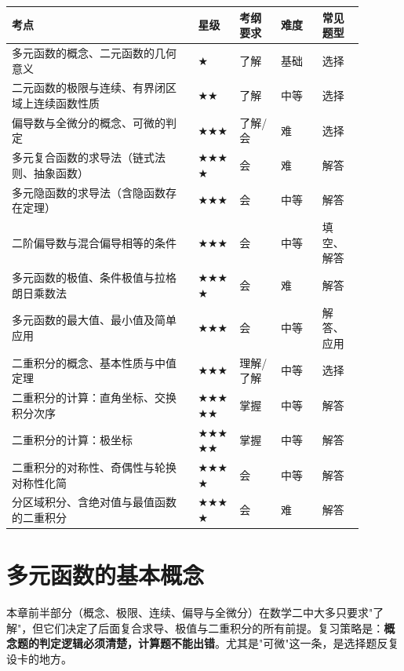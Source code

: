 \documentclass[11pt,openany,UTF8]{ctexbook}
\begin{document}
\begingroup\small\setlength{\tabcolsep}{4.0pt}
\begin{longtable}{@{}L{0.4597\linewidth}L{0.1086\linewidth}L{0.1086\linewidth}L{0.1086\linewidth}L{0.1086\linewidth}@{}}
\toprule
\textbf{考点} & \textbf{星级} & \textbf{考纲要求} & \textbf{难度} & \textbf{常见题型} \\
\midrule
\endhead
多元函数的概念、二元函数的几何意义 & $\bigstar$ & 了解 & 基础 & 选择 \\
二元函数的极限与连续、有界闭区域上连续函数性质 & $\bigstar$$\bigstar$ & 了解 & 中等 & 选择 \\
偏导数与全微分的概念、可微的判定 & $\bigstar$$\bigstar$$\bigstar$ & 了解/会 & 难 & 选择 \\
多元复合函数的求导法（链式法则、抽象函数） & $\bigstar$$\bigstar$$\bigstar$$\bigstar$ & 会 & 难 & 解答 \\
多元隐函数的求导法（含隐函数存在定理） & $\bigstar$$\bigstar$$\bigstar$ & 会 & 中等 & 解答 \\
二阶偏导数与混合偏导相等的条件 & $\bigstar$$\bigstar$$\bigstar$ & 会 & 中等 & 填空、解答 \\
多元函数的极值、条件极值与拉格朗日乘数法 & $\bigstar$$\bigstar$$\bigstar$$\bigstar$ & 会 & 难 & 解答 \\
多元函数的最大值、最小值及简单应用 & $\bigstar$$\bigstar$$\bigstar$ & 会 & 中等 & 解答、应用 \\
二重积分的概念、基本性质与中值定理 & $\bigstar$$\bigstar$$\bigstar$ & 理解/了解 & 中等 & 选择 \\
二重积分的计算：直角坐标、交换积分次序 & $\bigstar$$\bigstar$$\bigstar$$\bigstar$$\bigstar$ & 掌握 & 中等 & 解答 \\
二重积分的计算：极坐标 & $\bigstar$$\bigstar$$\bigstar$$\bigstar$$\bigstar$ & 掌握 & 中等 & 解答 \\
二重积分的对称性、奇偶性与轮换对称性化简 & $\bigstar$$\bigstar$$\bigstar$$\bigstar$ & 会 & 中等 & 解答 \\
分区域积分、含绝对值与最值函数的二重积分 & $\bigstar$$\bigstar$$\bigstar$$\bigstar$ & 会 & 难 & 解答 \\
\bottomrule
\end{longtable}
\endgroup

\section{多元函数的基本概念}

本章前半部分（概念、极限、连续、偏导与全微分）在数学二中大多只要求"了解"，但它们决定了后面复合求导、极值与二重积分的所有前提。复习策略是：\textbf{概念题的判定逻辑必须清楚，计算题不能出错}。尤其是"可微"这一条，是选择题反复设卡的地方。
\end{document}
